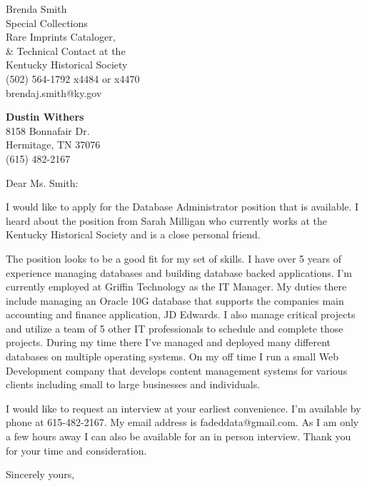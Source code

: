 \documentclass{letter}
\begin{document}
\signature{Dustin Withers}                  %
\longindentation=0pt                     %
\let\raggedleft\raggedright              %
 
\begin{letter}{Brenda Smith \\
Special Collections \\
Rare Imprints Cataloger, \\
\& Technical Contact at the \\
Kentucky Historical Society \\
(502) 564-1792 x4484 or x4470 \\
brendaj.smith@ky.gov} 

\begin{center}
{\large\bf Dustin Withers} \\
{8158 Bonnafair Dr. \\ Hermitage, TN 37076  \\ (615) 482-2167} 
\end{center} \vfill %
 

\opening{Dear Ms. Smith:}
 
\noindent I would like to apply for the Database Administrator position that is available. I heard about the position from Sarah Milligan who currently works at the Kentucky Historical Society and is a close personal friend.
 
\noindent The position looks to be a good fit for my set of skills. I have over 5 years of experience managing databases and building database backed applications. I'm currently employed at Griffin Technology as the IT Manager. My duties there include managing an Oracle 10G database that supports the companies main accounting and finance application, JD Edwards. I also manage critical projects and utilize a team of 5 other IT professionals to schedule and complete those projects. During my time there I've managed and deployed many different databases on multiple operating systems. On my off time I run a small Web Development company that develops content management systems for various clients including small to large businesses and individuals.
 
\noindent I would like to request an interview at your earliest convenience. I'm available by phone at 615-482-2167. My email address is fadeddata@gmail.com. As I am only a few hours away I can also be available for an in person interview. Thank you for your time and consideration.
 
\closing{Sincerely yours,}

  


\end{letter}
 
\end{document}
